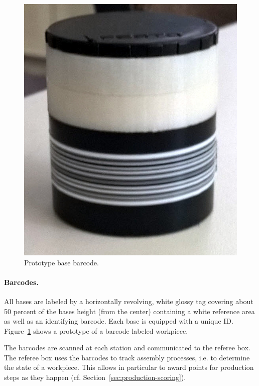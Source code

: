 \documentclass[12pt,twoside]{article}
\newcommand{\refsec}[1]{Section~\ref{#1}}
\newcommand{\reffig}[1]{Figure~\ref{#1}}
\begin{document}
\begin{figure}
  \centering
  \vspace{-2.7ex}
  \includegraphics[width=\linewidth]{figures/barcode-base}
  \caption{Prototype base barcode.}
  \label{fig:barcode}
\end{figure}
\paragraph{Barcodes.}
All bases are labeled by a horizontally revolving, white glossy tag
covering about 50 percent of the bases height (from the center)
containing a white reference area as well as an identifying
barcode. Each base is equipped with a unique ID. \reffig{fig:barcode}
shows a prototype of a barcode labeled workpiece.

The barcodes are scanned at each station and communicated to the
referee box. The referee box uses the barcodes to track assembly
processes, i.e. to determine the state of a workpiece. This allows in
particular to award points for production steps as they happen
(cf. \refsec{sec:production-scoring}).
\end{document}

